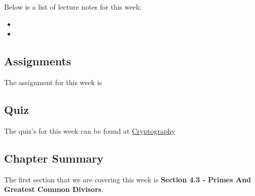 \noindent Below is a list of lecture notes for this week:

\begin{itemize}
    \item {}
    \item {}
\end{itemize}

\subsection{Assignments}

The assignment for this week is   

\subsection{Quiz}

The quiz's for this week can be found at \href{https://applied.cs.colorado.edu/mod/quiz/view.php?id=51735}{Cryptography}  

\subsection{Chapter Summary}

The first section that we are covering this week is \textbf{Section 4.3 - Primes And Greatest Common Divisors}.

